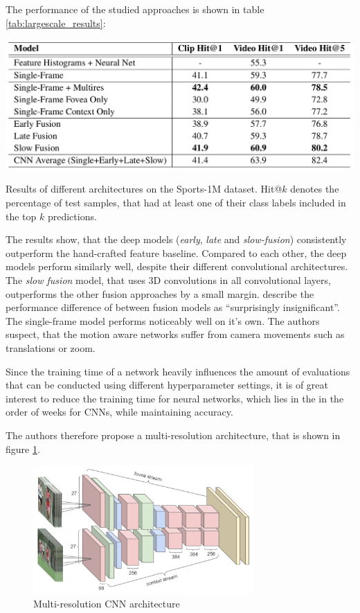 The performance of the studied approaches is shown in table \ref{tab:largescale_results}:
\begin{table}[H]
    \centering
    \includegraphics{img_deep/largescale_results}
    \caption{Results of different architectures on the Sports-1M dataset. Hit@$k$ denotes the percentage of test samples, that had at least one of their class labels included in the top $k$ predictions. \cite{karpathy_large-scale_2014}}
    \label{tab:largescale_results}
\end{table}

The results show, that the deep models (\textit{early}, \textit{late} and \textit{slow-fusion}) consistently outperform the hand-crafted feature baseline.
Compared to each other, the deep models perform similarly well, despite their different convolutional architectures.
The \textit{slow fusion} model, that uses 3D convolutions in all convolutional layers, outperforms the other fusion approaches by a small margin.
\textcite{karpathy_large-scale_2014} describe the performance difference of between fusion models as ``surprisingly insignificant''\cite{karpathy_large-scale_2014}.
The single-frame model performs noticeably well on it's own.
The authors suspect, that the motion aware networks suffer from camera movements such as translations or zoom.

Since the training time of a network heavily influences the amount of evaluations that can be conducted using different hyperparameter settings, it is of great interest to reduce the training time for neural networks, which lies in the in the order of weeks for CNNs\cite{karpathy_large-scale_2014}, while maintaining accuracy.

The authors therefore propose a multi-resolution architecture, that is shown in figure \ref{fig:largescale_multiresolution}.
\begin{figure}[H]
    \centering
    \includegraphics[width=0.75\textwidth]{img_deep/largescale_multiresolution.png}
    \caption{Multi-resolution CNN architecture \cite{karpathy_large-scale_2014}}
    \label{fig:largescale_multiresolution}
\end{figure}

